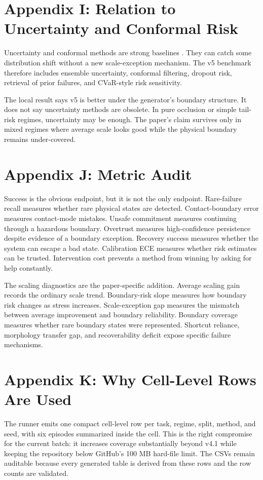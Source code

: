 \documentclass{article}
\begin{document}
\section{Appendix I: Relation to Uncertainty and Conformal Risk}
Uncertainty and conformal methods are strong baselines \citep{yang2023transferring8,consortium2026openhembodiment9,ranjan2026vlaforget10,dey2024revla11,agia2024unpacking12,wen2025humanoid13}. They can catch some distribution shift without a new scale-exception mechanism. The v5 benchmark therefore includes ensemble uncertainty, conformal filtering, dropout risk, retrieval of prior failures, and CVaR-style risk sensitivity.

The local result says v5 is better under the generator's boundary structure. It does not say uncertainty methods are obsolete. In pure occlusion or simple tail-risk regimes, uncertainty may be enough. The paper's claim survives only in mixed regimes where average scale looks good while the physical boundary remains under-covered.


\section{Appendix J: Metric Audit}
Success is the obvious endpoint, but it is not the only endpoint. Rare-failure recall measures whether rare physical states are detected. Contact-boundary error measures contact-mode mistakes. Unsafe commitment measures continuing through a hazardous boundary. Overtrust measures high-confidence persistence despite evidence of a boundary exception. Recovery success measures whether the system can escape a bad state. Calibration ECE measures whether risk estimates can be trusted. Intervention cost prevents a method from winning by asking for help constantly.

The scaling diagnostics are the paper-specific addition. Average scaling gain records the ordinary scale trend. Boundary-risk slope measures how boundary risk changes as stress increases. Scale-exception gap measures the mismatch between average improvement and boundary reliability. Boundary coverage measures whether rare boundary states were represented. Shortcut reliance, morphology transfer gap, and recoverability deficit expose specific failure mechanisms.


\section{Appendix K: Why Cell-Level Rows Are Used}
The runner emits one compact cell-level row per task, regime, split, method, and seed, with six episodes summarized inside the cell. This is the right compromise for the current batch: it increases coverage substantially beyond v4.1 while keeping the repository below GitHub's 100 MB hard-file limit. The CSVs remain auditable because every generated table is derived from these rows and the row counts are validated.
\end{document}
